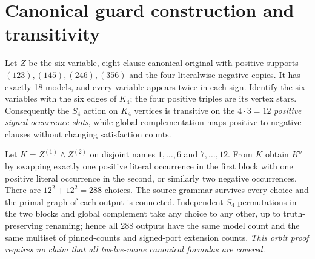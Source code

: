 \documentclass[11pt]{article}
\begin{document}
\section{Canonical guard construction and transitivity}
Let $Z$ be the six-variable, eight-clause canonical original with positive supports $(123),(145),(246),(356)$ and the four literalwise-negative copies. It has exactly 18 models, and every variable appears twice in each sign. Identify the six variables with the six edges of $K_4$; the four positive triples are its vertex stars. Consequently the $S_4$ action on $K_4$ vertices is transitive on the $4\cdot3=12$ \emph{positive signed occurrence slots}, while global complementation maps positive to negative clauses without changing satisfaction counts.

Let $K=Z^{(1)}\wedge Z^{(2)}$ on disjoint names $1,\ldots,6$ and $7,\ldots,12$. From $K$ obtain $K^{\sigma}$ by swapping exactly one positive literal occurrence in the first block with one positive literal occurrence in the second, or similarly two negative occurrences. There are $12^2+12^2=288$ choices. The source grammar survives every choice and the primal graph of each output is connected. Independent $S_4$ permutations in the two blocks and global complement take any choice to any other, up to truth-preserving renaming; hence all 288 outputs have the same model count and the same multiset of pinned-counts and signed-port extension counts. \emph{This orbit proof requires no claim that all twelve-name canonical formulas are covered.}
\end{document}
